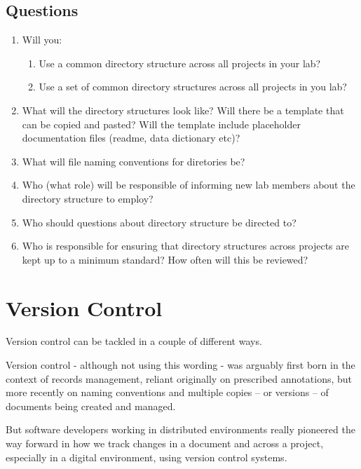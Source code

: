 \documentclass[
]{book}
\providecommand{\tightlist}{%
  \setlength{\itemsep}{0pt}\setlength{\parskip}{0pt}}
\begin{document}
\hypertarget{questions-2}{%
\section*{Questions}\label{questions-2}}

\begin{enumerate}
\def\labelenumi{\arabic{enumi}.}
\tightlist
\item
  Will you:

  \begin{enumerate}
  \def\labelenumii{\alph{enumii}.}
  \tightlist
  \item
    Use a common directory structure across all projects in your lab?
  \item
    Use a set of common directory structures across all projects in you lab?
  \end{enumerate}
\item
  What will the directory structures look like? Will there be a template that can be copied and pasted? Will the template include placeholder documentation files (readme, data dictionary etc)?
\item
  What will file naming conventions for diretories be?
\item
  Who (what role) will be responsible of informing new lab members about the directory structure to employ?
\item
  Who should questions about directory structure be directed to?
\item
  Who is responsible for ensuring that directory structures across projects are kept up to a minimum standard? How often will this be reviewed?
\end{enumerate}

\hypertarget{version-control-1}{%
\chapter*{Version Control}\label{version-control-1}}

Version control can be tackled in a couple of different ways.

Version control - although not using this wording - was arguably first born in the context of records management, reliant originally on prescribed annotations, but more recently on naming conventions and multiple copies -- or versions -- of documents being created and managed.

But software developers working in distributed environments really pioneered the way forward in how we track changes in a document and across a project, especially in a digital environment, using version control systems.
\end{document}
